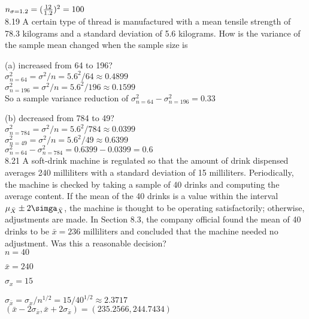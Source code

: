 $n_{\sigma = 1.2} = (\frac{12}{1.2})^2 = 100$ \\


8.19 A certain type of thread is manufactured with a
mean tensile strength of 78.3 kilograms and a standard
deviation of 5.6 kilograms. How is the variance of the
sample mean changed when the sample size is

(a) increased from 64 to 196? \\

$\sigma_{n=64}^2 = \sigma^2/n = 5.6^2/64 \approx 0.4899$ \\

$\sigma_{n=196}^2 = \sigma^2/n = 5.6^2/196 \approx 0.1599$ \\

So a sample variance reduction of $\sigma^2_{n=64} - \sigma^2_{n=196} = 0.33$

(b) decreased from 784 to 49? \\


$\sigma_{n=784}^2 = \sigma^2/n = 5.6^2/784 \approx 
0.0399
$ \\

$\sigma_{n=49}^2 = \sigma^2/n = 5.6^2/49 \approx 
0.6399
$ \\

$\sigma^2_{n=64} - \sigma^2_{n=784} = 0.6399 - 0.0399 = 0.6$ \\


8.21 A soft-drink machine is regulated so that the
amount of drink dispensed averages 240 milliliters with
a standard deviation of 15 milliliters. Periodically, the
machine is checked by taking a sample of 40 drinks
and computing the average content. If the mean of the
40 drinks is a value within the interval $\mu_{\bar{X}} \pm 2\simga_{\bar{X}}$, the
machine is thought to be operating satisfactorily; otherwise, adjustments are made. In Section 8.3, the company official found the mean of 40 drinks to be $\bar{x} = 236$
milliliters and concluded that the machine needed no
adjustment. Was this a reasonable decision? \\

$n = 40$

$\bar{x} = 240$

$\sigma_x = 15$ 

$\sigma_{\bar{x}} = \sigma_x/n^{1/2} = 15/40^{1/2} \approx 2.3717$ \\

$(\bar{x} - 2\sigma_{\bar{x}} , \bar{x} + 2\sigma_{\bar{x}}) = (
235.2566, 244.7434)$ \\

